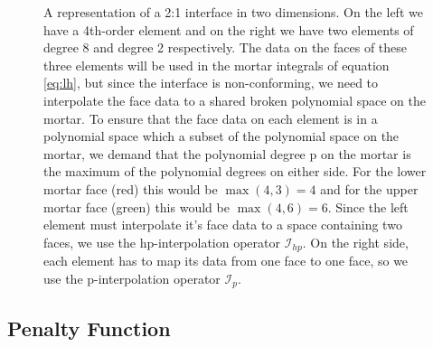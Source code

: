 \begin{figure}[ht!]
\medskip
\caption{A representation of a 2:1 interface in two dimensions. On the
  left we have a 4th-order element and on the right we have two
  elements of degree 8 and degree 2 respectively. The data on the
  faces of these three elements will be used in the mortar integrals
  of equation \ref{eq:lh}, but since the interface is
  non-conforming, we need to interpolate the face data to a shared
  broken polynomial space on the mortar. To ensure that the face data
  on each element is in a polynomial space which a subset of the
  polynomial space on the mortar, we demand that the polynomial degree
  p on the mortar is the maximum of the polynomial degrees on either
  side. For the lower mortar face (red) this would be $\max(4,3) = 4$
  and for the upper mortar face (green) this would be $\max(4,6) = 6$.
  Since the left element must interpolate it's face data to a
  space containing two faces, we use the hp-interpolation operator
  $\mathcal{I}_{hp}$. On the right side, each element has to map its
  data from one face to one face, so we use the p-interpolation
  operator $\mathcal{I}_p$.}
\end{figure}



\subsection{Penalty Function}

